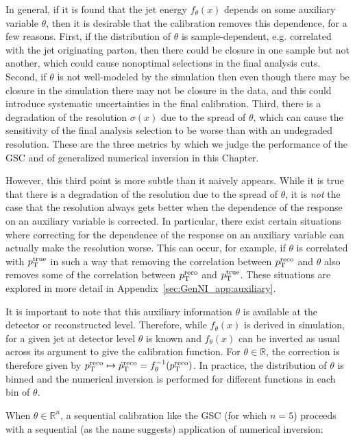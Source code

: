 In general, if it is found that the jet energy $f_\theta(x)$ depends on some auxiliary variable $\theta$, then it is desirable that the calibration removes this dependence, for a few reasons.
First, if the distribution of $\theta$ is sample-dependent, e.g. correlated with the jet originating parton, then there could be closure in one sample but not another, which could cause nonoptimal selections in the final analysis cuts.
Second, if $\theta$ is not well-modeled by the simulation then even though there may be closure in the simulation there may not be closure in the data, and this could introduce systematic uncertainties in the final calibration.
Third, there is a degradation of the resolution $\sigma(x)$ due to the spread of $\theta$, which can cause the sensitivity of the final analysis selection to be worse than with an undegraded resolution.
These are the three metrics by which we judge the performance of the GSC and of generalized numerical inversion in this Chapter.

However, this third point is more subtle than it naively appears.
While it is true that there is a degradation of the resolution due to the spread of $\theta$, it is \emph{not} the case that the resolution always gets better when the dependence of the response on an auxiliary variable is corrected.
In particular, there exist certain situations where correcting for the dependence of the response on an auxiliary variable can actually make the resolution worse.
This can occur, for example, if $\theta$ is correlated with $p_\text{T}^\text{true}$ in such a way that removing the correlation between $p_\text{T}^\text{reco}$ and $\theta$ also removes some of the correlation between $p_\text{T}^\text{reco}$ and $p_\text{T}^\text{true}$.
These situations are explored in more detail in Appendix~\ref{sec:GenNI_app:auxiliary}.

It is important to note that this auxiliary information $\theta$ is available at the detector or reconstructed level.
Therefore, while $f_\theta(x)$ is derived in simulation, for a given jet at detector level $\theta$ is known and $f_\theta(x)$ can be inverted as usual across its argument to give the calibration function.
For $\theta\in\mathbb{R}$, the correction is therefore given by $p_\text{T}^\text{reco}\mapsto \hat{p}_\text{T}^\text{reco} = f_\theta^{-1}(p_\text{T}^\text{reco})$.
In practice, the distribution of $\theta$ is binned and the numerical inversion is performed for different functions in each bin of $\theta$.


When $\theta\in\mathbb{R}^n$, a sequential calibration like the GSC (for which $n=5$) proceeds with a sequential (as the name suggests) application of numerical inversion:

